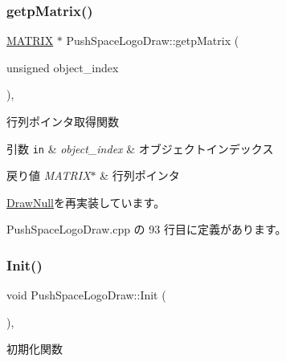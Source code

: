 \subsubsection{\texorpdfstring{getp\+Matrix()}{getpMatrix()}}
{\footnotesize\ttfamily \mbox{\hyperlink{_vector3_d_8h_a032295cd9fb1b711757c90667278e744}{M\+A\+T\+R\+IX}} $\ast$ Push\+Space\+Logo\+Draw\+::getp\+Matrix (\begin{DoxyParamCaption}\item[{unsigned}]{object\+\_\+index }\end{DoxyParamCaption})\hspace{0.3cm}{\ttfamily [override]}, {\ttfamily [virtual]}}



行列ポインタ取得関数 


\begin{DoxyParams}[1]{引数}
\mbox{\tt in}  & {\em object\+\_\+index} & オブジェクトインデックス \\
\hline
\end{DoxyParams}

\begin{DoxyRetVals}{戻り値}
{\em M\+A\+T\+R\+I\+X$\ast$} & 行列ポインタ \\
\hline
\end{DoxyRetVals}


\mbox{\hyperlink{class_draw_null_a9aac059eb3b5d1f77e8bd3aa0647cff9}{Draw\+Null}}を再実装しています。



 Push\+Space\+Logo\+Draw.\+cpp の 93 行目に定義があります。

\mbox{\label{class_push_space_logo_draw_a7ad3fe53d9bda4ea16c958bc102ff54e}} 
\subsubsection{\texorpdfstring{Init()}{Init()}}
{\footnotesize\ttfamily void Push\+Space\+Logo\+Draw\+::\+Init (\begin{DoxyParamCaption}{ }\end{DoxyParamCaption})\hspace{0.3cm}{\ttfamily [override]}, {\ttfamily [virtual]}}



初期化関数 



